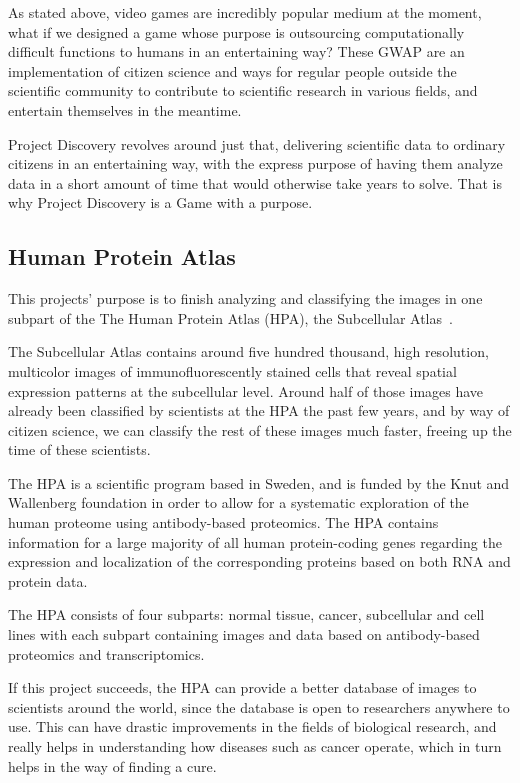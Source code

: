 As stated above, video games are incredibly popular medium at the moment, what if we designed a game whose purpose is outsourcing computationally difficult functions to humans in an entertaining way? These GWAP are an implementation of citizen science and ways for regular people outside the scientific community to contribute to scientific research in various fields, and entertain themselves in the meantime.

Project Discovery revolves around just that, delivering scientific data to ordinary citizens in an entertaining way, with the express purpose of having them analyze data in a short amount of time that would otherwise take years to solve. That is why Project Discovery is a Game with a purpose.

\subsection{Human Protein Atlas}

This projects' purpose is to finish analyzing and classifying the images in one subpart of the The Human Protein Atlas (HPA), the Subcellular Atlas~\cite{subcellatlas}.

The Subcellular Atlas contains around five hundred thousand, high resolution, multicolor images of immunofluorescently stained cells that reveal spatial expression patterns at the subcellular level. Around half of those images have already been classified by scientists at the HPA the past few years, and by way of citizen science, we can classify the rest of these images much faster, freeing up the time of these scientists.

The HPA is a scientific program based in Sweden, and is funded by the 
Knut and Wallenberg foundation in order to allow for a systematic exploration of the human proteome using antibody-based proteomics. The HPA contains information for a large majority of all human protein-coding genes regarding the expression and localization of the corresponding proteins based on both RNA and protein data.

The HPA consists of four subparts: normal tissue, cancer, subcellular and cell lines with each subpart containing images and data based on antibody-based proteomics and transcriptomics.

If this project succeeds, the HPA can provide a better database of images to scientists around the world, since the database is open to researchers anywhere to use. This can have drastic improvements in the fields of biological research, and really helps in understanding how diseases such as cancer operate, which in turn helps in the way of finding a cure. 

